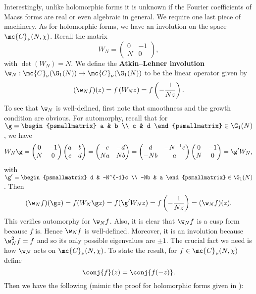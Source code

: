     Interestingly, unlike holomorphic forms it is unknown if the Fourier coefficients of Maass forms are real or even algebraic in general. We require one last piece of machinery. As for holomorphic forms, we have an involution on the space $\mc{C}_{\nu}(N,\chi)$. Recall the matrix
    \[
      W_{N} = \begin{pmatrix} 0 & -1 \\ N & 0 \end{pmatrix},
    \]
    with $\det(W_{N}) = N$. We define the \textbf{Atkin–Lehner involution} $\w_{N}:\mc{C}_{\nu}(\G_{1}(N)) \to \mc{C}_{\nu}(\G_{1}(N))$ to be the linear operator given by
    \[
      (\w_{N}f)(z) = f\left(W_{N}z\right) = f\left(-\frac{1}{Nz}\right).
    \]
    To see that $\w_{N}$ is well-defined, first note that smoothness and the growth condition are obvious. For automorphy, recall that for $\g = \begin{psmallmatrix} a & b \\ c & d \end{psmallmatrix} \in \G_{1}(N)$, we have
    \[
      W_{N}\g = \begin{pmatrix} 0 & -1 \\ N & 0 \end{pmatrix}\begin{pmatrix} a & b \\ c & d \end{pmatrix} = \begin{pmatrix} -c & -d \\ Na & Nb \\ \end{pmatrix} = \begin{pmatrix} d & -N^{-1}c \\ -Nb & a \end{pmatrix}\begin{pmatrix} 0 & -1 \\ N & 0 \end{pmatrix} = \g'W_{N},
    \]
    with $\g' = \begin{psmallmatrix} d & -N^{-1}c \\ -Nb & a \end{psmallmatrix} \in \G_{1}(N)$. Then
    \[
      (\w_{N}f)(\g z) = f(W_{N}\g z) = f(\g'W_{N}z) = f\left(-\frac{1}{Nz}\right) = (\w_{N}f)(z).
    \]
    This verifies automorphy for $\w_{N}f$. Also, it is clear that $\w_{N}f$ is a cusp form because $f$ is. Hence $\w_{N}f$ is well-defined. Moreover, it is an involution because $\w_{N}^{2}f = f$ and so its only possible eigenvalues are $\pm 1$. The crucial fact we need is how $\w_{N}$ acts on $\mc{C}_{\nu}(N,\chi)$. To state the result, for $f \in \mc{C}_{\nu}(N,\chi)$ define
    \[
      \conj{f}(z) = \conj{f(-z)}.
    \]
    Then we have the following (mimic the proof for holomorphic forms given in \cite{cohenmodular2017}):

